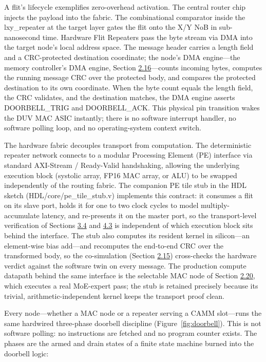 \documentclass[10pt,twocolumn]{article}
\begin{document}
A flit's lifecycle exemplifies zero-overhead activation. The central router chip injects the payload into the fabric. The combinational comparator inside the lxy\_repeater at the target layer gates the flit onto the X/Y NoB in sub-nanosecond time. Hardware Flit Repeaters pass the byte stream via DMA into the target node's local address space. The message header carries a length field and a CRC-protected destination coordinate; the node's DMA engine---the memory controller's DMA engine, Section \hyperref[sec:2.16]{2.16}---counts incoming bytes, computes the running message CRC over the protected body, and compares the protected destination to its own coordinate. When the byte count equals the length field, the CRC validates, and the destination matches, the DMA engine asserts DOORBELL\_TRIG and DOORBELL\_ACK. This physical pin transition wakes the DUV MAC ASIC instantly; there is no software interrupt handler, no software polling loop, and no operating-system context switch.

The hardware fabric decouples transport from computation. The deterministic repeater network connects to a modular Processing Element (PE) interface via standard AXI-Stream / Ready-Valid handshaking, allowing the underlying execution block (systolic array, FP16 MAC array, or ALU) to be swapped independently of the routing fabric. The companion PE tile stub in the HDL sketch (HDL/core/pe\_tile\_stub.v) implements this contract: it consumes a flit on its slave port, holds it for one to two clock cycles to model multiply-accumulate latency, and re-presents it on the master port, so the transport-level verification of Sections \hyperref[sec:3.4]{3.4} and \hyperref[sec:4.3]{4.3} is independent of which execution block sits behind the interface. The stub also computes its resident kernel in silicon---an element-wise bias add---and recomputes the end-to-end CRC over the transformed body, so the co-simulation (Section \hyperref[sec:2.15]{2.15}) cross-checks the hardware verdict against the software twin on every message. The production compute datapath behind the same interface is the selectable MAC node of Section \hyperref[sec:2.20]{2.20}, which executes a real MoE-expert pass; the stub is retained precisely because its trivial, arithmetic-independent kernel keeps the transport proof clean.

Every node---whether a MAC node or a repeater serving a CAMM slot---runs the same hardwired three-phase doorbell discipline (Figure~\ref{fig:doorbell}). This is not software polling: no instructions are fetched and no program counter exists. The phases are the armed and drain states of a finite state machine burned into the doorbell logic:
\end{document}
